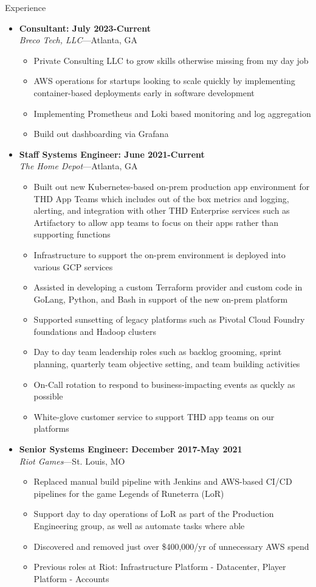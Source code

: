 \documentclass[10pt,oneside]{article}
\newenvironment{ressection}[1]{
    \vspace{4pt}
    {\fontfamily{phv}\selectfont\Large#1}
    \begin{itemize}
    \vspace{3pt}
}{
    \end{itemize}
}
\newcommand{\ressubitem}[1]{
    \vspace{-1pt}
    \item \begin{flushleft} #1 \end{flushleft}
}
\newcommand{\resbigitem}[3]{
    \vspace{-5pt}
    \item
    \textbf{#3} \\
    \textit{#1}---#2
}
\newenvironment{ressubsec}[3]{
    \resbigitem{#1}{#2}{#3}
    \vspace{-2pt}
    \begin{itemize}
}{
    \end{itemize}
}
\begin{document}
\begin{ressection}{Experience}
    \begin{ressubsec}{Breco Tech, LLC}{Atlanta, GA}{Consultant: July 2023-Current}
        \ressubitem{Private Consulting LLC to grow skills otherwise missing from my day job}
        \ressubitem{AWS operations for startups looking to scale quickly by implementing container-based deployments early in software development}
        \ressubitem{Implementing Prometheus and Loki based monitoring and log aggregation}
        \ressubitem{Build out dashboarding via Grafana}
    \end{ressubsec}

    \begin{ressubsec}{The Home Depot}{Atlanta, GA}{Staff Systems Engineer: June 2021-Current}
        \ressubitem{Built out new Kubernetes-based on-prem production app environment for THD App Teams which includes out of the box metrics and logging, alerting, and integration with other THD Enterprise services such as Artifactory to allow app teams to focus on their apps rather than supporting functions}
        \ressubitem{Infrastructure to support the on-prem environment is deployed into various GCP services}
        \ressubitem{Assisted in developing a custom Terraform provider and custom code in GoLang, Python, and Bash in support of the new on-prem platform}
        \ressubitem{Supported sunsetting of legacy platforms such as Pivotal Cloud Foundry foundations and Hadoop clusters}
        \ressubitem{Day to day team leadership roles such as backlog grooming, sprint planning, quarterly team objective setting, and team building activities}
        \ressubitem{On-Call rotation to respond to business-impacting events as quckly as possible}
        \ressubitem{White-glove customer service to support THD app teams on our platforms}
    \end{ressubsec}

    \begin{ressubsec}{Riot Games}{St. Louis, MO}{Senior Systems Engineer: December 2017-May 2021}
        \ressubitem{Replaced manual build pipeline with Jenkins and AWS-based CI/CD pipelines for the game Legends of Runeterra (LoR)}
        \ressubitem{Support day to day operations of LoR as part of the Production Engineering group, as well as automate tasks where able}
        \ressubitem{Discovered and removed just over \$400,000/yr of unnecessary AWS spend}
        \ressubitem{Previous roles at Riot: Infrastructure Platform - Datacenter, Player Platform - Accounts}
    \end{ressubsec}


\end{ressection}
\end{document}
